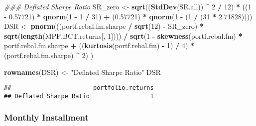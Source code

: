 \documentclass[]{article}
\newenvironment{Shaded}{\begin{snugshade}}{\end{snugshade}}
\newcommand{\CommentTok}[1]{\textcolor[rgb]{0.56,0.35,0.01}{\textit{#1}}}
\newcommand{\DecValTok}[1]{\textcolor[rgb]{0.00,0.00,0.81}{#1}}
\newcommand{\FloatTok}[1]{\textcolor[rgb]{0.00,0.00,0.81}{#1}}
\newcommand{\KeywordTok}[1]{\textcolor[rgb]{0.13,0.29,0.53}{\textbf{#1}}}
\newcommand{\NormalTok}[1]{#1}
\newcommand{\OperatorTok}[1]{\textcolor[rgb]{0.81,0.36,0.00}{\textbf{#1}}}
\newcommand{\StringTok}[1]{\textcolor[rgb]{0.31,0.60,0.02}{#1}}
\begin{document}
\begin{Shaded}
\begin{Highlighting}[]
\CommentTok{### Deflated Sharpe Ratio}
\NormalTok{SR_zero <-}
\StringTok{  }\KeywordTok{sqrt}\NormalTok{((}\KeywordTok{StdDev}\NormalTok{(SR.all)) }\OperatorTok{^}\StringTok{ }\DecValTok{2} \OperatorTok{/}\StringTok{ }\DecValTok{12}\NormalTok{) }\OperatorTok{*}\StringTok{ }\NormalTok{((}\DecValTok{1} \OperatorTok{-}\StringTok{ }\FloatTok{0.57721}\NormalTok{) }\OperatorTok{*}\StringTok{ }\KeywordTok{qnorm}\NormalTok{(}\DecValTok{1} \OperatorTok{-}\StringTok{ }\DecValTok{1} \OperatorTok{/}\StringTok{ }\DecValTok{31}\NormalTok{) }\OperatorTok{+}
\StringTok{                                       }\NormalTok{(}\FloatTok{0.57721}\NormalTok{) }\OperatorTok{*}\StringTok{ }\KeywordTok{qnorm}\NormalTok{(}\DecValTok{1} \OperatorTok{-}\StringTok{ }\NormalTok{(}\DecValTok{1} \OperatorTok{/}\StringTok{ }\NormalTok{(}\DecValTok{31} \OperatorTok{*}\StringTok{ }\FloatTok{2.71828}\NormalTok{))))}
\NormalTok{DSR <-}
\StringTok{  }\KeywordTok{pnorm}\NormalTok{(((portf.rebal.fm.sharpe }\OperatorTok{/}\StringTok{ }\KeywordTok{sqrt}\NormalTok{(}\DecValTok{12}\NormalTok{) }\OperatorTok{-}\StringTok{ }\NormalTok{SR_zero) }\OperatorTok{*}\StringTok{ }\KeywordTok{sqrt}\NormalTok{(}\KeywordTok{length}\NormalTok{(MPF.BCT.returns[, }\DecValTok{1}\NormalTok{]))) }\OperatorTok{/}
\StringTok{          }\KeywordTok{sqrt}\NormalTok{(}\DecValTok{1} \OperatorTok{-}\StringTok{ }\KeywordTok{skewness}\NormalTok{(portf.rebal.fm) }\OperatorTok{*}\StringTok{ }\NormalTok{portf.rebal.fm.sharpe }\OperatorTok{+}\StringTok{ }
\StringTok{                 }\NormalTok{((}\KeywordTok{kurtosis}\NormalTok{(portf.rebal.fm) }\OperatorTok{-}\StringTok{ }\DecValTok{1}\NormalTok{) }\OperatorTok{/}\StringTok{ }\DecValTok{4}\NormalTok{) }\OperatorTok{*}\StringTok{ }\NormalTok{(portf.rebal.fm.sharpe) }\OperatorTok{^}\StringTok{ }\DecValTok{2}\NormalTok{)}
\NormalTok{  )}

\KeywordTok{rownames}\NormalTok{(DSR) <-}\StringTok{ "Deflated Sharpe Ratio"}
\NormalTok{DSR}
\end{Highlighting}
\end{Shaded}

\begin{verbatim}
##                       portfolio.returns
## Deflated Sharpe Ratio                 1
\end{verbatim}

\hypertarget{monthly-installment}{%
\subsubsection{Monthly Installment}\label{monthly-installment}}
\end{document}
